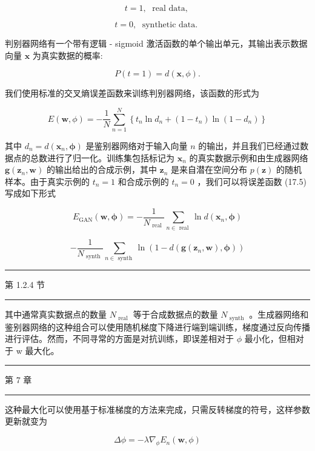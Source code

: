 \documentclass[10pt]{report}
\newcommand{\HRule}{\begin{center}\rule{0.9\linewidth}{0.2mm}\end{center}}
\begin{document}
\[
t = 1,\;\text{ real data, } \tag{17.2}
\]

\[
t = 0,\;\text{ synthetic data. } \tag{17.3}
\]

判别器网络有一个带有逻辑 -  sigmoid 激活函数的单个输出单元，其输出表示数据向量 \(\mathbf{x}\) 为真实数据的概率:

\[
P\left( {t = 1}\right)  = d\left( {\mathbf{x},\phi }\right) . \tag{17.4}
\]

我们使用标准的交叉熵误差函数来训练判别器网络，该函数的形式为

\[
E\left( {\mathbf{w},\phi }\right)  =  - \frac{1}{N}\mathop{\sum }\limits_{{n = 1}}^{N}\left\{  {{t}_{n}\ln {d}_{n} + \left( {1 - {t}_{n}}\right) \ln \left( {1 - {d}_{n}}\right) }\right\}   \tag{17.5}
\]

其中 \({d}_{n} = d\left( {{\mathbf{x}}_{n},\mathbf{\phi }}\right)\) 是鉴别器网络对于输入向量 \(n\) 的输出，并且我们已经通过数据点的总数进行了归一化。训练集包括标记为 \({\mathbf{x}}_{n}\) 的真实数据示例和由生成器网络 \(\mathbf{g}\left( {{\mathbf{z}}_{n},\mathbf{w}}\right)\) 的输出给出的合成示例，其中 \({\mathbf{z}}_{n}\) 是来自潜在空间分布 \(p\left( \mathbf{z}\right)\) 的随机样本。由于真实示例的 \({t}_{n} = 1\) 和合成示例的 \({t}_{n} = 0\) ，我们可以将误差函数 (17.5) 写成如下形式

\[
{E}_{\mathrm{{GAN}}}\left( {\mathbf{w},\mathbf{\phi }}\right)  =  - \frac{1}{{N}_{\text{ real }}}\mathop{\sum }\limits_{{n \in  \text{ real }}}\ln d\left( {{\mathbf{x}}_{n},\mathbf{\phi }}\right)
\]

\[
- \frac{1}{{N}_{\text{ synth }}}\mathop{\sum }\limits_{{n \in  \text{ synth }}}\ln \left( {1 - d\left( {\mathbf{g}\left( {{\mathbf{z}}_{n},\mathbf{w}}\right) ,\mathbf{\phi }}\right) }\right)  \tag{17.6}
\]

\HRule

第 1.2.4 节

\HRule

其中通常真实数据点的数量 \({N}_{\text{ real }}\) 等于合成数据点的数量 \({N}_{\text{ synth }}\) 。生成器网络和鉴别器网络的这种组合可以使用随机梯度下降进行端到端训练，梯度通过反向传播进行评估。然而，不同寻常的方面是对抗训练，即误差相对于 \(\phi\) 最小化，但相对于 w 最大化。

\HRule

第 7 章

\HRule

这种最大化可以使用基于标准梯度的方法来完成，只需反转梯度的符号，这样参数更新就变为

\[
{\Delta \phi } =  - \lambda {\nabla }_{\phi }{E}_{n}\left( {\mathbf{w},\phi }\right)  \tag{17.7}
\]
\end{document}
